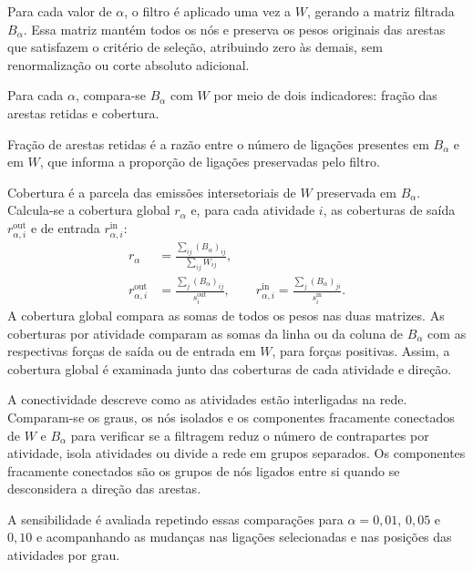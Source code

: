 Para cada valor de $\alpha$, o filtro é aplicado uma vez a $W$, gerando a matriz filtrada $B_\alpha$. Essa matriz mantém todos os nós e preserva os pesos originais das arestas que satisfazem o critério de seleção, atribuindo zero às demais, sem renormalização ou corte absoluto adicional.

Para cada $\alpha$, compara-se $B_\alpha$ com $W$ por meio de dois indicadores: fração das arestas retidas e cobertura.

Fração de arestas retidas é a razão entre o número de ligações presentes em $B_\alpha$ e em $W$, que informa a proporção de ligações preservadas pelo filtro.

Cobertura é a parcela das emissões intersetoriais de $W$ preservada em $B_\alpha$. Calcula-se a cobertura global $r_\alpha$ e, para cada atividade $i$, as coberturas de saída $r_{\alpha,i}^{\mathrm{out}}$ e de entrada $r_{\alpha,i}^{\mathrm{in}}$:
\begin{equation}
\begin{aligned}
r_\alpha&=\frac{\sum_{ij}(B_\alpha)_{ij}}{\sum_{ij}W_{ij}},\\
r_{\alpha,i}^{\mathrm{out}}&=\frac{\sum_j(B_\alpha)_{ij}}{s_i^{\mathrm{out}}},\qquad
r_{\alpha,i}^{\mathrm{in}}=\frac{\sum_j(B_\alpha)_{ji}}{s_i^{\mathrm{in}}}.
\end{aligned}
\label{eq:cobertura-backbone}
\end{equation}
A cobertura global compara as somas de todos os pesos nas duas matrizes. As coberturas por atividade comparam as somas da linha ou da coluna de $B_\alpha$ com as respectivas forças de saída ou de entrada em $W$, para forças positivas. Assim, a cobertura global é examinada junto das coberturas de cada atividade e direção.

A conectividade descreve como as atividades estão interligadas na rede. Comparam-se os graus, os nós isolados e os componentes fracamente conectados de $W$ e $B_\alpha$ para verificar se a filtragem reduz o número de contrapartes por atividade, isola atividades ou divide a rede em grupos separados. Os componentes fracamente conectados são os grupos de nós ligados entre si quando se desconsidera a direção das arestas.

A sensibilidade é avaliada repetindo essas comparações para $\alpha=0{,}01$, $0{,}05$ e $0{,}10$ e acompanhando as mudanças nas ligações selecionadas e nas posições das atividades por grau.
